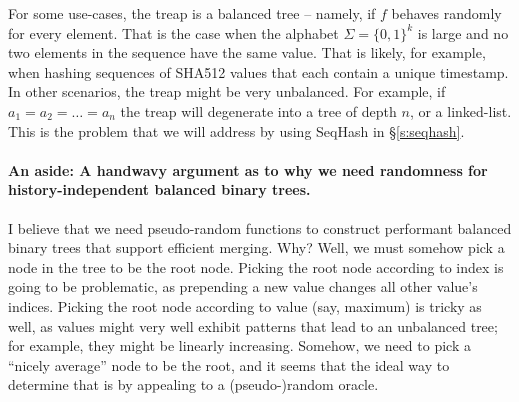 %


For some use-cases, the treap is a balanced tree -- namely, if $f$ behaves
randomly for every element. That is the case when the alphabet $\Sigma =
\{0,1\}^k$ is large and no two elements in the sequence have the same value.
That is likely, for example, when hashing sequences of SHA512 values that each
contain a unique timestamp. In other scenarios, the treap might be very
unbalanced.  For example, if $a_1 = a_2 = \ldots = a_n$ the treap will
degenerate into a tree of depth $n$, or a linked-list. This is the problem that
we will address by using SeqHash in \S\ref{s:seqhash}.

\paragraph{An aside: A handwavy argument as to why we need randomness for
history-independent balanced binary trees.} I believe that we need
pseudo-random functions to construct performant balanced binary trees that
support efficient merging. Why? Well, we must somehow pick a node in the tree
to be the root node. Picking the root node according to index is going to be
problematic, as prepending a new value changes all other value's indices.
Picking the root node according to value (say, maximum) is tricky as well, as
values might very well exhibit patterns that lead to an unbalanced tree; for
example, they might be linearly increasing.  Somehow, we need to pick a
``nicely average'' node to be the root, and it seems that the ideal way to
determine that is by appealing to a (pseudo-)random oracle.
